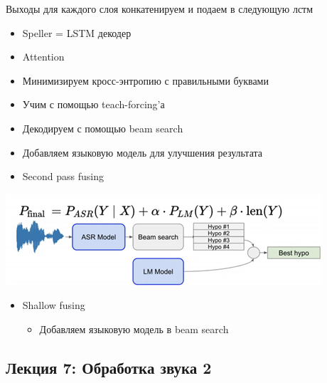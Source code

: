 \documentclass[a4paper, 12pt]{article}
\begin{document}
Выходы для каждого слоя конкатенируем и подаем в следующую лстм


\begin{itemize}
\item
  
  Speller = LSTM декодер
  
\item
  
  Attention
  
\item
  
  Минимизируем кросс-энтропию с правильными буквами
  
\item
  
  Учим с помощью teach-forcing'а
  
\item
  
  Декодируем с помощью beam search
  
\item
  
  Добавляем языковую модель для улучшения результата
  
\item
  
  {Second pass fusing}
  
\end{itemize}

\includegraphics[width=4.62500in,height=1.34375in]{media/image9.png}

\begin{itemize}
\item
  
  {Shallow fusing}
  

  \begin{itemize}
  \item
    
    Добавляем языковую модель в beam search
    
  \end{itemize}
\end{itemize}

\subsection{\texorpdfstring{\textbf{Лекция 7: Обработка звука
2}}{Лекция 7: Обработка звука 2}}\label{ux43bux435ux43aux446ux438ux44f-7-ux43eux431ux440ux430ux431ux43eux442ux43aux430-ux437ux432ux443ux43aux430-2}
\end{document}
